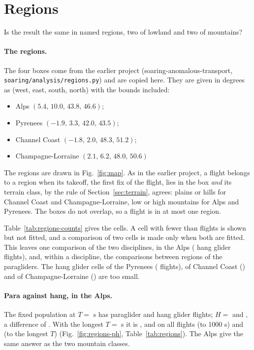 \section{Regions}\label{sec:regions}

Is the result the same in named regions, two of lowland and two of mountains?

\paragraph{The regions.} The four boxes come from the earlier project (soaring-anomalous-transport,
\texttt{soaring/analysis/regions.py}) and are copied here. They are given in degrees as (west, east, south, north) with the bounds
included:
\begin{itemize}
\item Alps $(5.4,\,10.0,\,43.8,\,46.6)$;
\item Pyrenees $(-1.9,\,3.3,\,42.0,\,43.5)$;
\item Channel Coast $(-1.8,\,2.0,\,48.3,\,51.2)$;
\item Champagne-Lorraine $(2.1,\,6.2,\,48.0,\,50.6)$
\end{itemize}
The regions are drawn in Fig.~\ref{fig:map}. As in the earlier project, a flight belongs to a region when
its takeoff, the first fix of the flight, lies in the box \emph{and} its terrain class, by the rule of Section~\ref{sec:terrain},
agrees: plains or hills for Channel Coast and Champagne-Lorraine, low or high mountains for Alps and Pyrenees. The boxes do not
overlap, so a flight is in at most one region.



Table~\ref{tab:regions-counts} gives the cells. A cell with fewer than \UniMinCell{} flights is shown but not fitted, and a
comparison of two cells is made only when both are fitted. This leaves one comparison of the two disciplines, in the Alps
(\UniRegionHangAlpsFlights{} hang glider flights), and, within a discipline, the comparisons between regions of the paragliders. The
hang glider cells of the Pyrenees (\UniRegionHangPyrFlights{} flights), of Channel Coast (\UniRegionHangChannelFlights{}) and of
Champagne-Lorraine (\UniRegionHangChampagneFlights{}) are too small.

\paragraph{Para against hang, in the Alps.} The fixed population at $T=$ \UniTauFixed{} s has \UniRegNFirstAlpsAfixed{} paraglider
and \UniRegNSecondAlpsAfixed{} hang glider flights; $H=$ \UniRegHFirstAlpsAfixed{} \UniRegHBandFirstAlpsAfixed{} and
\UniRegHSecondAlpsAfixed{} \UniRegHBandSecondAlpsAfixed{}, a difference of \UniRegDHAlpsAfixed{} \UniRegDHBandAlpsAfixed.
With the longest $T=$ \UniRegTAlpsAlongest{} s it is \UniRegDHAlpsAlongest{} \UniRegDHBandAlpsAlongest, and on all flights
\UniRegDHAlpsBkilo{} (to 1000 s) and \UniRegDHAlpsBlongest{} (to the longest $T$) (Fig.~\ref{fig:regions-ph}, Table~\ref{tab:regions}).
The Alps give the same answer as the two mountain classes.

